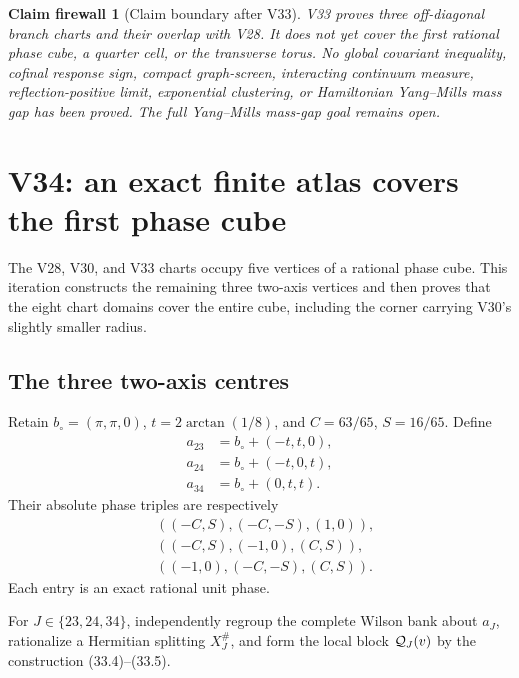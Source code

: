 \documentclass[11pt,oneside]{article}
\newtheorem{firewall}[theorem]{Claim firewall}
\theoremstyle{definition}
\theoremstyle{remark}
\begin{document}
\begin{firewall}[Claim boundary after V33]
\label{fire:newv33-final}
V33 proves three off-diagonal branch charts and their overlap with
V28.  It does not yet cover the first rational phase cube, a
quarter cell, or the transverse torus.  No global covariant
inequality, cofinal response sign, compact graph-screen, interacting
continuum measure, reflection-positive limit, exponential
clustering, or Hamiltonian Yang--Mills mass gap has been proved.
The full Yang--Mills mass-gap goal remains open.
\end{firewall}

\section{V34: an exact finite atlas covers the first phase cube}
\label{sec:newv34-first-cube}

The V28, V30, and V33 charts occupy five vertices of a rational
phase cube.  This iteration constructs the remaining three
two-axis vertices and then proves that the eight chart domains cover
the entire cube, including the corner carrying V30's slightly
smaller radius.

\subsection{The three two-axis centres}

Retain \(b_\circ=(\pi,\pi,0)\), \(t=2\arctan(1/8)\), and
\(C=63/65\), \(S=16/65\).  Define
\[
\begin{split}
 a_{23}&=b_\circ+(-t,t,0),\\
 a_{24}&=b_\circ+(-t,0,t),\\
 a_{34}&=b_\circ+(0,t,t).
\end{split}                                             \tag{34.1}
\]
Their absolute phase triples are respectively
\[
\begin{split}
 &((-C,S),(-C,-S),(1,0)),\\
 &((-C,S),(-1,0),(C,S)),\\
 &((-1,0),(-C,-S),(C,S)).
\end{split}                                             \tag{34.2}
\]
Each entry is an exact rational unit phase.

For \(J\in\{23,24,34\}\), independently regroup the complete Wilson
bank about \(a_J\), rationalize a Hermitian splitting \(X_J^\#\),
and form the local block \({\cal Q}_J(v)\) by the construction
(33.4)--(33.5).
\end{document}
